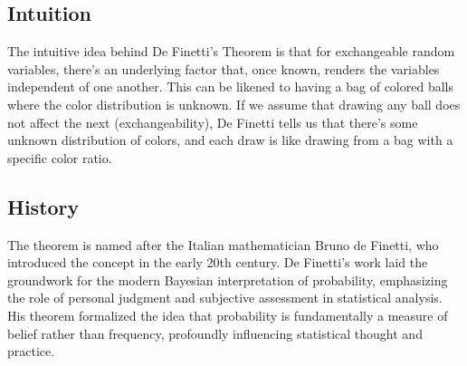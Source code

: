\documentclass{article}
\begin{document}
\subsection{Intuition}
The intuitive idea behind De Finetti's Theorem is that for exchangeable random variables, there's an underlying factor that, once known, renders the variables independent of one another. This can be likened to having a bag of colored balls where the color distribution is unknown. If we assume that drawing any ball does not affect the next (exchangeability), De Finetti tells us that there's some unknown distribution of colors, and each draw is like drawing from a bag with a specific color ratio.

\subsection{History}
The theorem is named after the Italian mathematician Bruno de Finetti, who introduced the concept in the early 20th century. De Finetti's work laid the groundwork for the modern Bayesian interpretation of probability, emphasizing the role of personal judgment and subjective assessment in statistical analysis. His theorem formalized the idea that probability is fundamentally a measure of belief rather than frequency, profoundly influencing statistical thought and practice.
\end{document}
